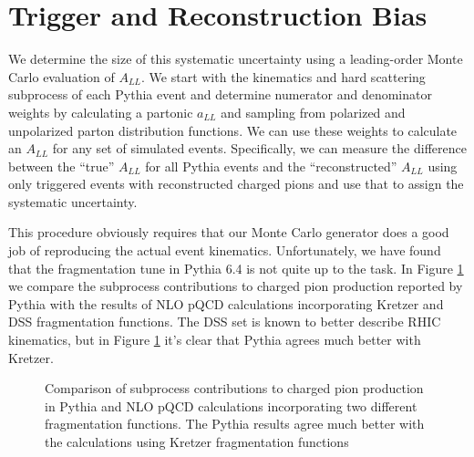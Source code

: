 \section{Trigger and Reconstruction Bias}

We determine the size of this systematic uncertainty using a leading-order Monte Carlo evaluation of $A_{LL}$.  We start with the kinematics and hard scattering subprocess of each Pythia event and determine numerator and denominator weights by calculating a partonic $a_{LL}$ and sampling from polarized and unpolarized parton distribution functions.  We can use these weights to calculate an $A_{LL}$ for any set of simulated events.  Specifically, we can measure the difference between the ``true'' $A_{LL}$ for all Pythia events and the ``reconstructed'' $A_{LL}$ using only triggered events with reconstructed charged pions and use that to assign the systematic uncertainty.

This procedure obviously requires that our Monte Carlo generator does a good job of reproducing the actual event kinematics.  Unfortunately, we have found that the fragmentation tune in Pythia 6.4 is not quite up to the task.  In Figure \ref{fig:subprocess-fractions} we compare the subprocess contributions to charged pion production reported by Pythia with the results of NLO pQCD calculations incorporating Kretzer and DSS fragmentation functions.  The DSS set is known to better describe RHIC kinematics, but in Figure \ref{fig:subprocess-fractions} it's clear that Pythia agrees much better with Kretzer.  

\begin{figure}
  \caption{Comparison of subprocess contributions to charged pion production
  in Pythia and NLO pQCD calculations incorporating two different
  fragmentation functions. The Pythia results agree much better with the
  calculations using Kretzer fragmentation functions}
  \label{fig:subprocess-fractions}
\end{figure}

